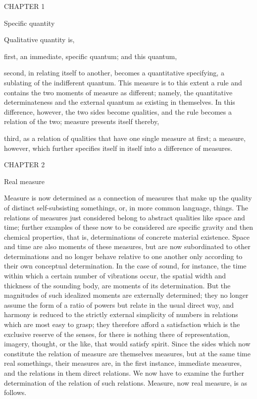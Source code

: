 CHAPTER 1

Specific quantity

Qualitative quantity is,

first, an immediate, specific quantum; and this quantum,

second, in relating itself to another,
becomes a quantitative specifying,
a sublating of the indifferent quantum.
This measure is to this extent a rule
and contains the two moments of measure as different;
namely, the quantitative determinateness
and the external quantum as existing in themselves.
In this difference, however, the two sides become qualities,
and the rule becomes a relation of the two;
measure presents itself thereby,

third, as a relation of qualities that have one single measure at first;
a measure, however, which further specifies itself in itself
into a difference of measures.

CHAPTER 2

Real measure

Measure is now determined as a connection of measures
that make up the quality of distinct self-subsisting somethings,
or, in more common language, things.
The relations of measures just considered belong
to abstract qualities like space and time;
further examples of these now to be considered
are specific gravity and then chemical properties,
that is, determinations of concrete material existence.
Space and time are also moments of these measures,
but are now subordinated to other determinations
and no longer behave relative to one another
only according to their own conceptual determination.
In the case of sound, for instance,
the time within which a certain number of vibrations occur,
the spatial width and thickness of the sounding body,
are moments of its determination.
But the magnitudes of such idealized moments are externally determined;
they no longer assume the form of a ratio of powers
but relate in the usual direct way,
and harmony is reduced to the strictly
external simplicity of numbers in relations
which are most easy to grasp;
they therefore afford a satisfaction
which is the exclusive reserve of the senses,
for there is nothing there of representation,
imagery, thought, or the like,
that would satisfy spirit.
Since the sides which now constitute
the relation of measure are themselves measures,
but at the same time real somethings, their measures are,
in the first instance, immediate measures,
and the relations in them direct relations.
We now have to examine the further determination of
the relation of such relations.
Measure, now real measure, is as follows.

